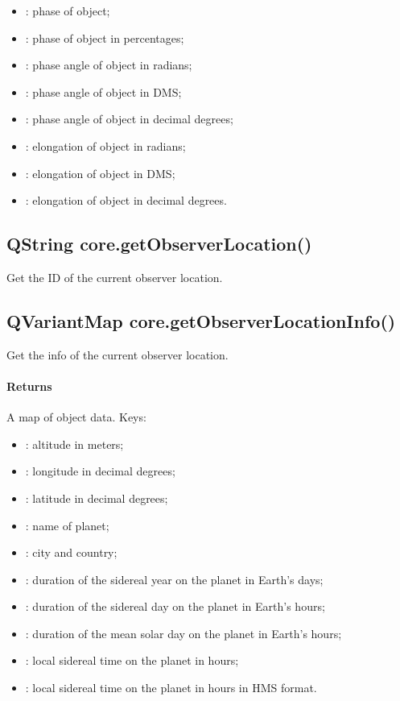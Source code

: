 \begin{itemize}
\item {}: phase of object\footnotemark[2];
\item {}: phase of object in percentages\footnotemark[2];
\item {}: phase angle of object in radians\footnotemark[2];
\item {}: phase angle of object in DMS\footnotemark[2];
\item {}: phase angle of object in decimal degrees\footnotemark[2];
\item {}: elongation of object in radians\footnotemark[2];
\item {}: elongation of object in DMS\footnotemark[2];
\item {}: elongation of object in decimal degrees\footnotemark[2].
\end{itemize}

\subsection{QString core.getObserverLocation()}
\label{sec:ScriptingAPI:core:getObserverLocation}
Get the ID of the current observer location.

\subsection{QVariantMap core.getObserverLocationInfo()}
\label{sec:ScriptingAPI:core:getObserverLocationInfo}
Get the info of the current observer location.

\paragraph{Returns}
A map of object data. Keys:
\begin{itemize}
\item {}: altitude in meters;
\item {}: longitude in decimal degrees;
\item {}: latitude in decimal degrees;
\item {}: name of planet;
\item {}: city and country;
\item {}: duration of the sidereal year on the planet in Earth's days;
\item {}: duration of the sidereal day on the planet in Earth's hours;
\item {}: duration of the mean solar day on the planet in Earth's hours;
\item {}: local sidereal time on the planet in hours;
\item {}: local sidereal time on the planet in hours in HMS format.
\end{itemize}


